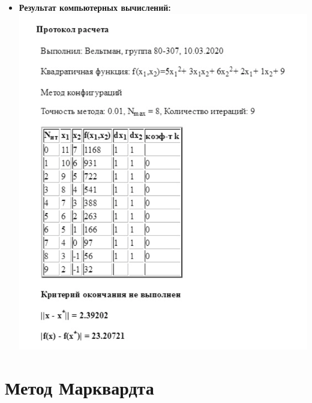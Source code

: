 \begin{itemize}
    \item {\bfseries Результат компьютерных вычислений:} \\
    \includegraphics[scale = 0.6]{img/1.PNG}
    
\end{itemize}


\pagebreak

\section{Метод Марквардта}

